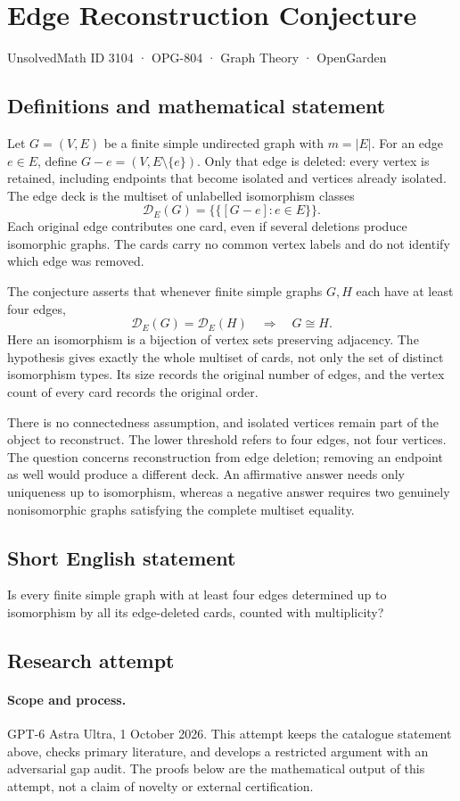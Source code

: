 \documentclass[11pt,a4paper]{article}
\begin{document}
\section*{Edge Reconstruction Conjecture}\label{3104}
{\small UnsolvedMath ID 3104 · OPG-804 · Graph Theory · OpenGarden}
\subsection{Definitions and mathematical statement}
Let $G=(V,E)$ be a finite simple undirected graph with $m=|E|$.
For an edge $e\in E$, define $G-e=(V,E\setminus\{e\})$.
Only that edge is deleted: every vertex is retained, including endpoints
that become isolated and vertices already isolated. The edge deck is the
multiset of unlabelled isomorphism classes
\[
 \mathcal D_E(G)=\{\!\{[G-e]:e\in E\}\!\}.
\]
Each original edge contributes one card, even if several deletions produce
isomorphic graphs. The cards carry no common vertex labels and do not
identify which edge was removed.

The conjecture asserts that whenever finite simple graphs $G,H$ each
have at least four edges,
\[
 \mathcal D_E(G)=\mathcal D_E(H)\quad\Longrightarrow\quad G\cong H.
\]
Here an isomorphism is a bijection of vertex sets preserving adjacency.
The hypothesis gives exactly the whole multiset of cards, not only the
set of distinct isomorphism types. Its size records the original number
of edges, and the vertex count of every card records the original order.

There is no connectedness assumption, and isolated vertices remain part
of the object to reconstruct. The lower threshold refers to four edges,
not four vertices. The question concerns reconstruction from edge deletion;
removing an endpoint as well would produce a different deck.
An affirmative answer needs only uniqueness up to isomorphism, whereas
a negative answer requires two genuinely nonisomorphic graphs satisfying
the complete multiset equality.
\subsection{Short English statement}
Is every finite simple graph with at least four edges determined up to isomorphism by all its edge-deleted cards, counted with multiplicity?
\subsection{Research attempt}
\paragraph{Scope and process.}
GPT-6 Astra Ultra, 1 October 2026. This attempt keeps the catalogue statement above, checks primary literature, and develops a restricted argument with an adversarial gap audit. The proofs below are the mathematical output of this attempt, not a claim of novelty or external certification.
\end{document}
